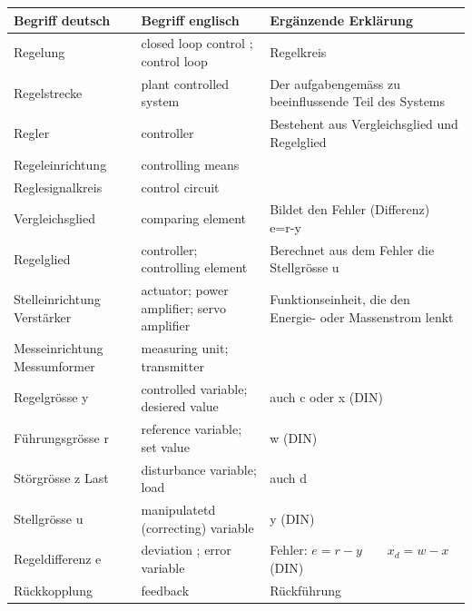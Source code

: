 	\begin{tabular}{|p{2.7cm}|p{5.4cm}|l|}
    	\hline
    	{\bf Begriff deutsch}		&{\bf Begriff englisch}	&{\bf Ergänzende
    	Erklärung} \skript{13}\\
		\hline
		Regelung			& closed loop control ; control loop & Regelkreis\\
		\hline
		Regelstrecke		& plant controlled system	&Der aufgabengemäss zu beeinflussende
    	Teil des Systems\\
    	\hline
    	Regler				& controller			&Bestehent aus Vergleichsglied und Regelglied\\
    	\hline
    	Regeleinrichtung	& controlling means&\\
    	\hline
    	Reglesignalkreis	& control circuit&\\
    	\hline
    	Vergleichsglied		& comparing element	&Bildet den Fehler (Differenz)
    											e=r-y\\
    	\hline
    	Regelglied			&controller;
    						controlling element	&Berechnet aus dem Fehler die Stellgrösse u\\
    	\hline
    	Stelleinrichtung
    	Verstärker			&actuator;
					    	power amplifier;
    						servo amplifier		&Funktionseinheit, die den Energie- oder Massenstrom
    											lenkt\\
    	\hline
    	Messeinrichtung
    	Messumformer		&measuring unit;
    						transmitter&\\
    	\hline
    	Regelgrösse y		&controlled variable;
    						desiered value& auch c oder x (DIN)\\
    	\hline
    	Führungsgrösse r	&reference variable;
    						set value& w (DIN)\\
    	\hline
    	Störgrösse z Last	&disturbance variable;
    						load& auch d\\
    	\hline
    	Stellgrösse u		&manipulatetd (correcting)
    						variable& y (DIN)\\
    	\hline
    	Regeldifferenz e	&deviation ; error variable		& Fehler: $e=r-y \quad \quad x_d=w-x$ (DIN) \\
    	\hline
    	Rückkopplung		&feedback			&Rückführung\\
    	\hline

	\end{tabular}\\

		
